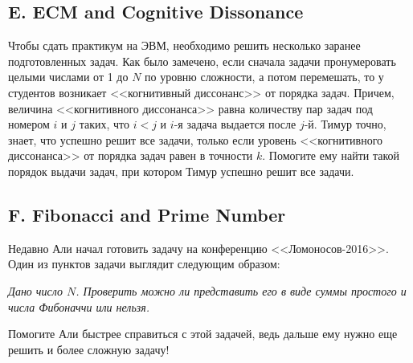 




\subsection*{E. ECM and Cognitive Dissonance}

Чтобы сдать практикум на ЭВМ, необходимо решить несколько заранее подготовленных задач. Как было замечено, если сначала задачи пронумеровать целыми числами от 1 до $N$ по уровню сложности, а потом перемешать, то у студентов возникает <<когнитивный диссонанс>> от порядка задач. Причем, величина <<когнитивного диссонанса>> равна количеству пар задач под номером $i$ и $j$ таких, что $i < j$ и $i$-я задача выдается после $j$-й. Тимур точно, знает, что успешно решит все задачи, только если уровень <<когнитивного диссонанса>> от порядка задач равен в точности $k$. Помогите ему найти такой порядок выдачи задач, при котором Тимур успешно решит все задачи.






\subsection*{F. Fibonacci and Prime Number}

Недавно Али начал готовить задачу на конференцию <<Ломоносов-2016>>. Один из пунктов задачи выглядит следующим образом: 

\textit{Дано число $N$. Проверить можно ли представить его в виде суммы простого и числа Фибоначчи или нельзя.}

Помогите Али быстрее справиться с этой задачей, ведь дальше ему нужно еще решить и более сложную задачу! 

